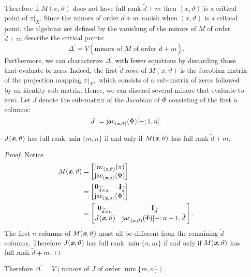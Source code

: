 \documentclass[sigconf]{acmart}
\def\xb{\textit{\textbf{x}}}
\def\vt{\vartheta}
\def\jac{ \textrm{jac}}
\def\dt{\widetilde{d}}
\def\bbm{\begin{bmatrix}}
\def\ebm{\end{bmatrix}}
\begin{document}
Therefore if $M(x,\vt)$ does not have full rank $\dt+m$ then $(x,\vt)$ is a critical point of $\pi|_X$. Since the minors of order $\dt+m$ vanish when $(x,\vt)$ is a critical point, the algebraic set defined by the vanishing of the minors of $M$ of order $\dt + m$ describe the critical points:
\[
\Delta^{'} = V(\textrm{minors of }M\textrm{ of order }\dt + m).
\]
Furthermore, we can characterize $\Delta^{'}$ with fewer equations by discarding those that evaluate to zero. Indeed, the first $\dt$ rows of $M(x,\vt)$ is the Jacobian matrix of the projection mapping $\pi|_X,$ which consists of a sub-matrix of zeros followed by an identity sub-matrix. Hence, we can discard several minors that evaluate to zero. Let $J$ denote the sub-matrix of the Jacobian of $\Phi$ consisting of the first $n$ columns:
 \[
 J := \jac_{(\xb,\vt)}(\Phi)[-;1,n].
 \]
%
\begin{proposition} 
$J(\xb,\vt)$ has full rank $\min\{m,n\}$ if and only if $M(\xb,\vt)$ has full rank $\dt+m.$ 
\end{proposition}
%
\begin{proof}
Notice 
%
\begin{align*}
M(\xb,\vt)&= 
\bbm 
\jac_{(\xb,\vt)}(\pi)\\
\jac_{(\xb,\vt)}(\Phi) 
\ebm \\
&=
\bbm 
\textbf{0}_{\dt \times n}\hspace{5mm}\textbf{I}_{\dt} \\
\jac_{(\xb,\vt)}(\Phi)
\ebm\\
&=
\bbm 
\textbf{0}_{\dt \times n} &\textbf{I}_{\dt} \\
J(\xb,\vt)     &\jac_{(\xb,\vt)}(\Phi)[-;n+1,\dt]
\ebm.
\end{align*}
%
The first $n$ columns of $M(\xb,\vt)$ must all be different from the remaining $\dt$ columns. Therefore $J(\xb,\vt)$ has full rank $\min\{n,m\}$ if and only if $M(\xb,\vt)$ has full rank $\dt+m.$
\end{proof}
%
Therefore $\Delta^{'} = V(\textrm{minors of }J\textrm{ of order }\min\{m,n\}).$
%
\end{document}
